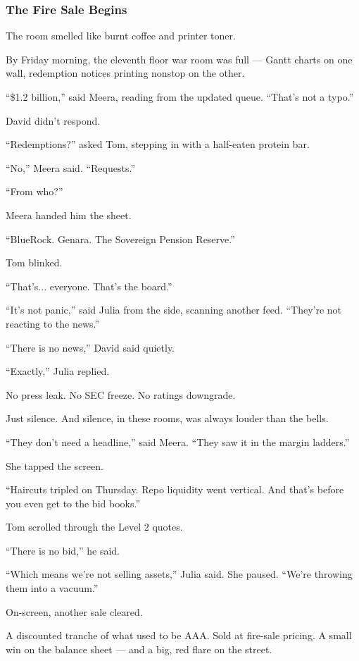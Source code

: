 \medskip


\subsubsection{The Fire Sale Begins}

The room smelled like burnt coffee and printer toner.

By Friday morning, the eleventh floor war room was full — Gantt charts on one wall, redemption notices printing nonstop on the other.

``\$1.2 billion,'' said Meera, reading from the updated queue. ``That’s not a typo.''

David didn’t respond.

``Redemptions?'' asked Tom, stepping in with a half-eaten protein bar.

``No,'' Meera said. ``Requests.''

``From who?''

Meera handed him the sheet.

``BlueRock. Genara. The Sovereign Pension Reserve.''

Tom blinked.

``That’s... everyone. That’s the board.''

``It’s not panic,'' said Julia from the side, scanning another feed. ``They’re not reacting to the news.''

``There is no news,'' David said quietly.

``Exactly,'' Julia replied.

No press leak.  
No SEC freeze.  
No ratings downgrade.

Just silence.  
And silence, in these rooms, was always louder than the bells.

``They don’t need a headline,'' said Meera. ``They saw it in the margin ladders.''

She tapped the screen.

``Haircuts tripled on Thursday. Repo liquidity went vertical. And that’s before you even get to the bid books.''

Tom scrolled through the Level 2 quotes.

``There is no bid,'' he said.

``Which means we’re not selling assets,'' Julia said. She paused. ``We’re throwing them into a vacuum.''

On-screen, another sale cleared.

A discounted tranche of what used to be AAA. Sold at fire-sale pricing.  
A small win on the balance sheet — and a big, red flare on the street.

